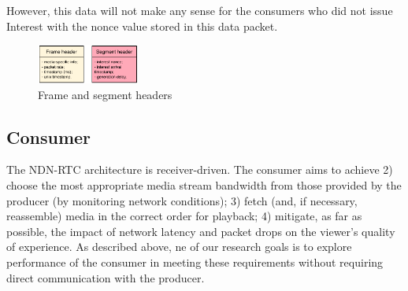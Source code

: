 \documentclass{icn/sig-alternate-2012} %
\newcommand{\ndnrtcName}{NDN-RTC} %
\begin{document}
However, this data will not make any sense for the consumers who did not issue Interest with the nonce value stored in this data packet.


%

%


\begin{figure}[t!]
\centering
\includegraphics[width=0.3\textwidth]{data-struct}
\vspace{-4pt}
\caption{Frame and segment headers}
\label{fig:data-struct}
\end{figure}

\subsection{Consumer}

The \ndnrtcName{} architecture is receiver-driven. The consumer aims to achieve 2) choose the most appropriate media stream bandwidth from those  provided by the producer (by monitoring network conditions); 3) fetch (and, if necessary, reassemble) media in the correct order for playback; 4) mitigate, as far as possible, the impact of network latency and packet drops on the viewer's quality of experience.  As described above, ne of our research goals is to explore performance of the consumer in meeting these requirements without requiring direct communication with the producer.

\end{document}
